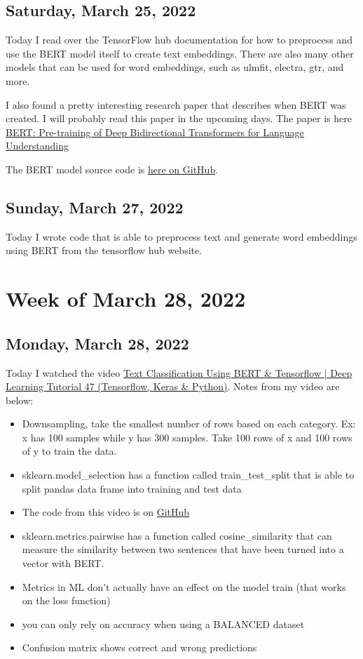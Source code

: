 \documentclass[11pt,letterpaper]{article}
\begin{document}
\subsection{Saturday, March 25, 2022}
Today I read over the TensorFlow hub documentation for how to preprocess and use the BERT model itself to create text embeddings. There are also many other models that can be used for word embeddings, such as ulmfit, electra, gtr, and more.

I also found a pretty interesting research paper that describes when BERT was created. I will probably read this paper in the upcoming days. The paper is here \href{https://arxiv.org/abs/1810.04805}{BERT: Pre-training of Deep Bidirectional Transformers for Language Understanding
}

The BERT model source code is \href{https://github.com/google-research/bert}{here on GitHub}.

\subsection{Sunday, March 27, 2022}
Today I wrote code that is able to preprocess text and generate word embeddings using BERT from the tensorflow hub website.

\section{Week of March 28, 2022}
\subsection{Monday, March 28, 2022}
Today I watched the video \href{https://www.youtube.com/watch?v=hOCDJyZ6quA}{Text Classification Using BERT & Tensorflow | Deep Learning Tutorial 47 (Tensorflow, Keras & Python)}. Notes from my video are below:

\begin{itemize}
    \item Downsampling, take the smallest number of rows based on each category. Ex: x has 100 samples while y has 300 samples. Take 100 rows of x and 100 rows of y to train the data.
    \item sklearn.model\_selection has a function called train\_test\_split that is able to split pandas data frame into training and test data
    \item The code from this video is on \href{https://github.com/codebasics/deep-learning-keras-tf-tutorial/blob/master/47_BERT_text_classification/BERT_email_classification-handle-imbalance.ipynb}{GitHub}
    \item sklearn.metrics.pairwise has a function called cosine\_similarity that can measure the similarity between two sentences that have been turned into a vector with BERT.
    \item Metrics in ML don't actually have an effect on the model train (that works on the loss function)
    \item you can only rely on accuracy when using a BALANCED dataset
    \item Confusion matrix shows correct and wrong predictions
\end{itemize}
\end{document}
